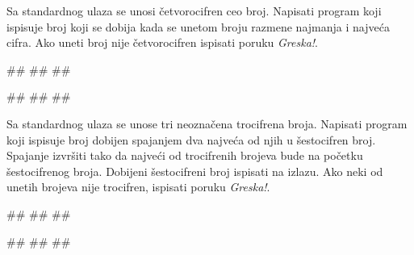 \begin{Exercise}[label=p1.2_] 
 Sa standardnog ulaza se unosi četvorocifren ceo broj. Napisati program koji ispisuje broj koji se dobija kada se unetom broju razmene najmanja i najveća cifra. Ako uneti broj nije četvorocifren ispisati poruku \textit{Greska!}. \\
\begin{miditest}
\begin{upotreba}{1}
#\naslovInt#
##
##
\end{upotreba}
\end{miditest}
\begin{miditest}
\begin{upotreba}{2}
#\naslovInt#
##
##
\end{upotreba}
\end{miditest}

\end{Exercise}
\begin{Answer}[ref=p1.2_]
\end{Answer}

\begin{Exercise}[label=p1.2_] 
 Sa standardnog ulaza se unose tri neoznačena trocifrena broja. Napisati program koji ispisuje broj dobijen spajanjem 
dva najveća od njih u šestocifren broj. Spajanje izvršiti tako da najveći od trocifrenih
brojeva bude na početku šestocifrenog broja. Dobijeni šestocifreni broj ispisati
na izlazu. Ako neki od unetih brojeva nije trocifren, ispisati poruku \textit{Greska!}.\\
\begin{miditest}
\begin{upotreba}{1}
#\naslovInt#
##
##
\end{upotreba}
\end{miditest}
\begin{miditest}
\begin{upotreba}{2}
#\naslovInt#
##
##
\end{upotreba}
\end{miditest}

\end{Exercise}
\begin{Answer}[ref=p1.2_]
\end{Answer}

